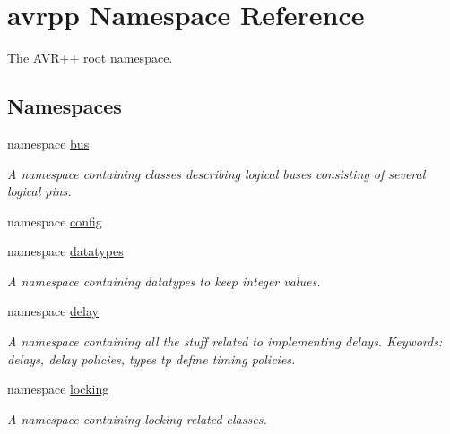 \hypertarget{namespaceavrpp}{
\section{avrpp Namespace Reference}
\label{namespaceavrpp}
}


The AVR++ root namespace.  


\subsection*{Namespaces}
\begin{DoxyCompactItemize}
\item 
namespace \hyperlink{namespaceavrpp_1_1bus}{bus}


\begin{DoxyCompactList}\small\item\em A namespace containing classes describing logical buses consisting of several logical pins. \item\end{DoxyCompactList}

\item 
namespace \hyperlink{namespaceavrpp_1_1config}{config}
\item 
namespace \hyperlink{namespaceavrpp_1_1datatypes}{datatypes}


\begin{DoxyCompactList}\small\item\em A namespace containing datatypes to keep integer values. \item\end{DoxyCompactList}

\item 
namespace \hyperlink{namespaceavrpp_1_1delay}{delay}


\begin{DoxyCompactList}\small\item\em A namespace containing all the stuff related to implementing delays. Keywords: delays, delay policies, types tp define timing policies. \item\end{DoxyCompactList}

\item 
namespace \hyperlink{namespaceavrpp_1_1locking}{locking}


\begin{DoxyCompactList}\small\item\em A namespace containing locking-\/related classes. \item\end{DoxyCompactList}


\end{DoxyCompactItemize}
